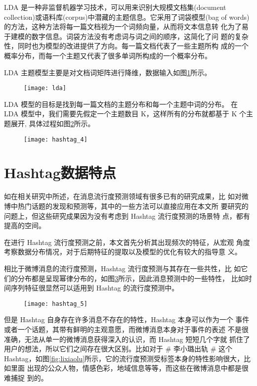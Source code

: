 LDA 是一种非监督机器学习技术，可以用来识别大规模文档集(document collection)或语料库(corpus)中潜藏的主题信息。它采用了词袋模型(bag of words)的方法，这种方法将每一篇文档视为一个词频向量，从而将文本信息转 化为了易于建模的数字信息。词袋方法没有考虑词与词之间的顺序，这简化了问 题的复杂性，同时也为模型的改进提供了方向。每一篇文档代表了一些主题所构 成的一个概率分布，而每一个主题又代表了很多单词所构成的一个概率分布。

LDA 主题模型主要是对文档词矩阵进行降维，数据输入如图\ref{fig:piu_6}所示。

\begin{figure}[H]
    \centering
    \texttt{[image: lda]}
    \label{fig:piu_6}
\end{figure}


LDA 模型的目标是找到每一篇文档的主题分布和每一个主题中词的分布。 在 LDA 模型中，我们需要先假定一个主题数目 K，这样所有的分布就都基于 K 个主题展开, 具体过程如图\ref{fig:piu_7}所示。
\begin{figure}[H]
    \centering
    \texttt{[image: hashtag\_4]}
    \label{fig:piu_7}
\end{figure}

\section{Hashtag数据特点}

如在相关研究中所述，在消息流行度预测领域有很多已有的研究成果，比 如对微博中热门话题的发现和预测等，其中的一些方法可以直接应用在本文所 要研究的问题上，但这些研究成果因为没有考虑到 Hashtag 流行度预测的场景特 点，都有提高的空间。

在进行 Hashtag 流行度预测之前，本文首先分析其出现频次的特征，从宏观 角度考察数据分布情况，对于后期特征的提取以及模型的优化有较大的指导意 义。

相比于微博消息的流行度预测，Hashtag 流行度预测与其存在一些共性，比 如它们的分布都是呈现幂律分布的，如图\ref{fig:piu_8}所示，因此消息预测中的一些特性， 比如时间序列特征很显然可以适用到 Hashtag 的流行度预测中。


\begin{figure}[H]
    \centering
    \texttt{[image: hashtag\_5]}
    \label{fig:piu_8}
\end{figure}


但是 Hashtag 自身存在许多消息不存在的特性，Hashtag 本身可以作为一个 事件或者一个话题，其带有鲜明的主观意愿，而微博消息本身对于事件的表述 不是很准确，无法从单一的微博消息获得深入的认识，而 Hashtag 短短几个字就 抓住了用户的想法，所以它们之间存在很大区别。比如对于 \# 李小璐出轨 \# 这个 Hashtag，如图\ref{fig:lixiaolu}所示，它的流行度预测受标签本身的特性影响很大，比如里面 出现的公众人物，情感色彩，地域信息等等，而这些在微博消息中都是很难捕捉 到的。


